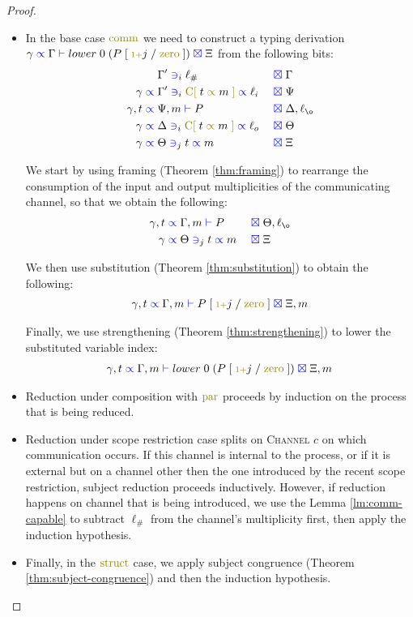 \documentclass[a4paper,UKenglish,cleveref, autoref, thm-restate,authorcolumns]{lipics-v2019}
\theoremstyle{definition}
\newcommand{\type}[1]{\textcolor{blue}{\operatorname{#1}}}
\newcommand{\constr}[1]{\textcolor{olive}{\operatorname{#1}}}
\newcommand{\suc}{\constr{\scriptstyle 1+}}
\newcommand{\channel}[2]{\constr{C[} \; #1 \; \constr{\propto} \; #2 \; \constr{]}}
\newcommand{\subst}[3]{#1 \; [ \; #2 \; / \;#3 \;]}
\newcommand{\types}[4]{#1 \; \type{\propto} \; #2 \; \type{\vdash} \; #3 \; \type{\boxtimes} \; #4}
\newcommand{\contains}[6]{#1 \; \type{\propto} \; #2 \; \type{\ni}_{#3} \; #4 \; \type{\propto} \; #5 \; \type{\boxtimes} \; #6}
\newcommand{\containsusage}[4]{#1 \; \type{\ni}_{#2} \; #3 \; \type{\boxtimes} \; #4}
\begin{document}
\begin{proof}
  \hfill{}\\
  \begin{itemize}
    \item
    In the base case $\constr{comm}$ we need to construct a typing derivation $\types{\gamma}{\Gamma}{lower \; 0 \; (\subst{P}{\suc j}{\constr{zero}})}{\Xi}$ from the following bits:
    \begin{alignat*}{2}
      \containsusage{&\Gamma'}{i}{\ell_\# &&}{\Gamma} \\
      \contains{\gamma}{&\Gamma'}{i}{\channel{t}{m}}{\ell_i &&}{\Psi} \\
      \types{\gamma , t}{&\Psi , m}{P &&}{\Delta , \ell_{\o}} \\
      \contains{\gamma}{&\Delta }{i}{\channel{t}{m}}{\ell_o &&}{\Theta} \\
      \contains{\gamma}{&\Theta}{j}{t}{m &&}{\Xi}
    \end{alignat*}

    We start by using framing (Theorem \ref{thm:framing}) to rearrange the consumption of the input and output multiplicities of the communicating channel, so that we obtain the following:
    \begin{alignat*}{2}
      \types{\gamma , t}{& \Gamma , m}{P &&}{\Theta , \ell_{\o}} \\
      \contains{\gamma}{& \Theta}{j}{t}{m &&}{\Xi}
    \end{alignat*}

    We then use substitution (Theorem \ref{thm:substitution}) to obtain the following:
    \begin{align*}
      \types{\gamma , t}{\Gamma , m}{\subst{P}{\suc j}{\constr{zero}}}{\Xi , m}
    \end{align*}

    Finally, we use strengthening (Theorem \ref{thm:strengthening}) to lower the substituted variable index:
    \begin{align*}
      \types{\gamma , t}{\Gamma , m}{lower \; 0 \; (\subst{P}{\suc j}{\constr{zero}})}{\Xi , m}
    \end{align*}
  
    \item
    Reduction under composition with $\constr{par}$ proceeds by induction on the process that is being reduced.

    \item
    Reduction under scope restriction case splits on \textsc{Channel} $c$ on which communication occurs.
    If this channel is internal to the process, or if it is external but on a channel other then the one introduced by the recent scope restriction, subject reduction proceeds inductively.
    However, if reduction happens on channel that is being introduced, we use the Lemma \ref{lm:comm-capable} to subtract $\ell_\#$ from the channel's multiplicity first, then apply the induction hypothesis.

    \item
    Finally, in the $\constr{struct}$ case, we apply subject congruence (Theorem \ref{thm:subject-congruence}) and then the induction hypothesis.
  \end{itemize}
\end{proof}
\end{document}
